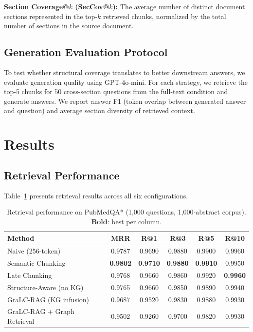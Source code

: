 \documentclass[sn-basic]{sn-jnl}
\newcommand{\gralcrag}{GraLC-RAG}
\begin{document}
\textbf{Section Coverage@$k$ (SecCov@$k$):} The average number of distinct document sections represented in the top-$k$ retrieved chunks, normalized by the total number of sections in the source document.

\subsection{Generation Evaluation Protocol}\label{sec:generation-protocol}

To test whether structural coverage translates to better downstream answers, we evaluate generation quality using GPT-4o-mini. For each strategy, we retrieve the top-5 chunks for 50 cross-section questions from the full-text condition and generate answers. We report answer F1 (token overlap between generated answer and question) and average section diversity of retrieved context.

\section{Results}\label{sec:results}

\subsection{Retrieval Performance}\label{sec:retrieval-results}

Table~\ref{tab:retrieval} presents retrieval results across all six configurations.

\begin{table}[ht]
\centering
\caption{Retrieval performance on PubMedQA* (1,000 questions, 1,000-abstract corpus). \textbf{Bold}: best per column.}
\label{tab:retrieval}
\small
\begin{tabular}{@{}lccccc@{}}
\toprule
\textbf{Method} & \textbf{MRR} & \textbf{R@1} & \textbf{R@3} & \textbf{R@5} & \textbf{R@10} \\
\midrule
Naive (256-token)                & 0.9787 & 0.9690 & 0.9880 & 0.9900 & 0.9960 \\
Semantic Chunking                & \textbf{0.9802} & \textbf{0.9710} & \textbf{0.9880} & \textbf{0.9910} & 0.9950 \\
Late Chunking                    & 0.9768 & 0.9660 & 0.9860 & 0.9920 & \textbf{0.9960} \\
Structure-Aware (no KG)          & 0.9765 & 0.9660 & 0.9850 & 0.9890 & 0.9940 \\
\gralcrag{} (KG infusion)       & 0.9687 & 0.9520 & 0.9830 & 0.9880 & 0.9930 \\
\gralcrag{} + Graph Retrieval   & 0.9502 & 0.9260 & 0.9700 & 0.9820 & 0.9930 \\
\bottomrule
\end{tabular}
\end{table}
\end{document}
